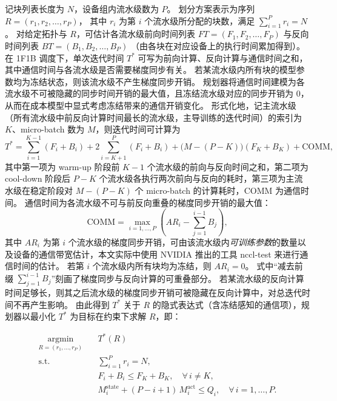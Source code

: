 记块列表长度为 $N$，设备组内流水级数为 $P$。
划分方案表示为序列 $R = (r_1, r_2, \ldots, r_P)$，
其中 $r_i$ 为第 $i$ 个流水级所分配的块数，满足 $\sum_{i=1}^P r_i = N$。
对给定拓扑与 $R$，可估计各流水级前向时间列表 $\mathit{FT} = (F_1, F_2,\ldots, F_P)$ 与反向时间列表 $\mathit{BT} = (B_1, B_2,\ldots, B_P)$
（由各块在对应设备上的执行时间累加得到）。
在 1F1B 调度下，单次迭代时间 $T^*$ 可写为前向计算、反向计算与通信时间之和，其中通信时间与各流水级是否需要梯度同步有关。
若某流水级内所有块的模型参数均为冻结状态，则该流水级不产生梯度同步开销。
规划器将通信时间建模为各流水级不可被隐藏的同步时间开销的最大值，且冻结流水级对应的同步开销为 0，从而在成本模型中显式考虑冻结带来的通信开销变化。
形式化地，记主流水级（所有流水级中前反向计算时间最长的流水级，主导训练的迭代时间）的索引为 $K$、micro-batch 数为 $M$，则迭代时间可计算为
\begin{equation}
\label{eq:chap3-tstar}
  T^* = \sum_{i=1}^{K-1}(F_i+B_i) + 2\sum_{i=K+1}^{P}(F_i+B_i) + \bigl(M-(P-K)\bigr)(F_K+B_K) + \mathrm{COMM},
\end{equation}
其中第一项为 warm-up 阶段前 $K-1$ 个流水级的前向与反向时间之和，第二项为 cool-down 阶段后 $P-K$ 个流水级各执行两次前向与反向的耗时，第三项为主流水级在稳定阶段对 $M-(P-K)$ 个 micro-batch 的计算耗时，$\mathrm{COMM}$ 为通信时间。
通信时间为各流水级不可与前反向重叠的梯度同步开销的最大值：
\begin{equation}
  \mathrm{COMM} = \max_{i=1,\ldots,P} \left( AR_i - \sum_{j=1}^{i-1} B_j \right),
\end{equation}
其中 $AR_i$ 为第 $i$ 个流水级的梯度同步开销，可由该流水级内\emph{可训练参数}的数量以及设备的通信带宽估计，本文实际中使用 NVIDIA 推出的工具 nccl-test 来进行通信时间的估计。
若第 $i$ 个流水级内所有块均为冻结，则 $AR_i = 0$。
式中“减去前缀 $\sum_{j=1}^{i-1} B_j$”刻画了梯度同步与反向计算的可重叠部分。
若某流水级的反向计算时间足够长，则其之后流水级的梯度同步开销可被隐藏在反向计算中，对总迭代时间不再产生影响。
由此得到 $T^*$ 关于 $R$ 的隐式表达式（含冻结感知的通信项），规划器以最小化 $T^*$ 为目标在约束下求解 $R$，即：

\begin{equation}
\label{eq:chap3-partition-opt}
\begin{aligned}
\operatorname*{argmin}_{R=(r_1,\ldots,r_P)} \quad & T^*(R) \\
\text{s.t.} \quad & \sum_{i=1}^{P} r_i = N, \\
& F_i + B_i \leq F_K + B_K, \quad \forall\, i \neq K, \\
& M_i^{\mathrm{state}} + (P-i+1)\, M_i^{\mathrm{act}} \leq Q_i, \quad \forall\, i=1,\ldots,P.
\end{aligned}
\end{equation}

